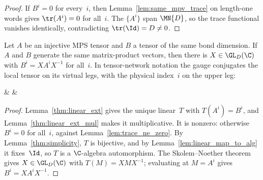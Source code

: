 \begin{proof}
    \leanok
    If $B^i = 0$ for every~$i$, then Lemma~\ref{lem:same_mpv_trace} on
    length-one words gives $\tr(A^i) = 0$ for all~$i$. The $\{A^i\}$ span
    $\MN{D}$, so the trace functional vanishes identically, contradicting
    $\tr(\Id) = D \neq 0$.
\end{proof}


\begin{theorem}\label{thm:ft_single}
    \leanok
    Let $A$ be an injective MPS tensor and $B$ a tensor of the same bond
    dimension. If $A$ and $B$ generate the same matrix-product vectors, then
    there is $X \in \GL_D(\C)$ with $B^i = X A^i X^{-1}$ for all~$i$. In
    tensor-network notation the gauge conjugates the local tensor on its virtual
    legs, with the physical index~$i$ on the upper leg:
    \begin{center}
        \tenkzkernel
        \begin{tenkz}[rows={wire}, cols=3, west=open, east=open]
             &  &
        \end{tenkz}
    \end{center}
\end{theorem}

\begin{proof}
    \leanok
    Lemma~\ref{thm:linear_ext} gives the unique linear~$T$ with
    $T(A^i) = B^i$, and Lemma~\ref{thm:linear_ext_mul} makes it
    multiplicative. It is nonzero: otherwise $B^i = 0$ for all~$i$, against
    Lemma~\ref{lem:trace_ne_zero}. By Lemma~\ref{thm:simplicity}, $T$ is
    bijective, and by Lemma~\ref{lem:linear_map_to_alg} it fixes~$\Id$, so $T$
    is a $\C$-algebra automorphism. The Skolem--Noether theorem
    \cite[``Skolem--Noether'']{QICLean2026Blueprint} gives
    $X \in \GL_D(\C)$ with $T(M) = X M X^{-1}$; evaluating at $M = A^i$
    gives $B^i = X A^i X^{-1}$.
\end{proof}

